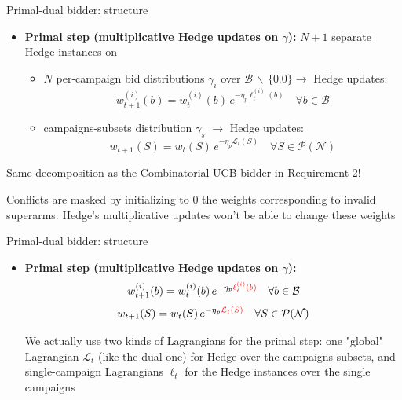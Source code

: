 \begin{frame}{Primal-dual bidder: structure}
    \begin{itemize}
        \item \textbf{Primal step (multiplicative Hedge updates on $\gamma$):} $N + 1$ separate Hedge instances on
        \begin{itemize}
            \item $N$ per-campaign bid distributions $\gamma_i$ over $\mathcal{B}\, \backslash\, \{0.0\} \rightarrow$ Hedge updates: \[w_{t+1}^{(i)}(b) = w_t^{(i)}(b)\, e^{-\eta_p \ell_t^{(i)}(b)} \quad \forall b \in \mathcal{B}\]
            \item campaigns-subsets distribution $\gamma_s$  $\rightarrow$ Hedge updates: \[w_{t+1}(S) = w_t(S)\, e^{-\eta_p \mathcal{L}_t(S)} \quad \forall S \in \mathcal{\mathcal{P}(N)}\]
        \end{itemize}
    \end{itemize}

    \begin{block}{}
        Same decomposition as the Combinatorial-UCB bidder in Requirement 2!
    \end{block}
    
    \begin{block}{}
        Conflicts are masked by initializing to $0$ the weights corresponding to invalid superarms: Hedge's multiplicative updates won't be able to change these weights
    \end{block}
\end{frame}

\begin{frame}{Primal-dual bidder: structure}
    \begin{itemize}
        \item \textbf{Primal step (multiplicative Hedge updates on $\gamma$):} 
        \[w_{t+1}^{(i)}(b) = w_t^{(i)}(b)\, e^{-\eta_p \textcolor{red}{\ell_t^{(i)}(b)}} \quad \forall b \in \mathcal{B}\]
        \[w_{t+1}(S) = w_t(S)\, e^{-\eta_p \textcolor{red}{\mathcal{L}_t(S)}} \quad \forall S \in \mathcal{\mathcal{P}(N)}\]

        \begin{block}{}
            We actually use two kinds of Lagrangians for the primal step: one "global" Lagrangian $\mathcal{L}_t$ (like the dual one) for Hedge over the campaigns subsets, and single-campaign Lagrangians $\ell_t$ for the Hedge instances over the single campaigns
        \end{block}
    \end{itemize}
\end{frame}

